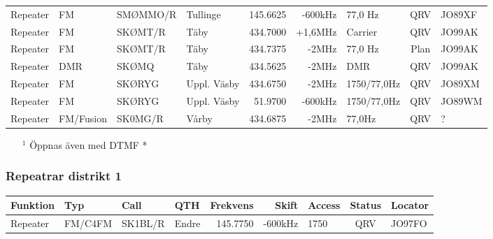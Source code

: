 \begin{longtable}{llllrrlcl}
	Repeater           & FM           & SMØMMO/R      & Tullinge     &          145.6625 &        -600kHz & 77,0 Hz         &       QRV       & JO89XF           \\
	Repeater           & FM           & SKØMT/R       & Täby         &          434.7000 &        +1,6MHz & Carrier         &       QRV       & JO99AK           \\
	Repeater           & FM           & SKØMT/R       & Täby         &          434.7375 &          -2MHz & 77,0 Hz         &      Plan       & JO99AK           \\
	Repeater           & DMR          & SKØMQ         & Täby         &          434.5625 &          -2MHz & DMR             &       QRV       & JO99AK           \\
	Repeater           & FM           & SKØRYG        & Uppl. Väsby  &          434.6750 &          -2MHz & 1750/77,0Hz     &       QRV       & JO89XM           \\
	Repeater           & FM           & SKØRYG        & Uppl. Väsby  &           51.9700 &        -600kHz & 1750/77,0Hz     &       QRV       & JO89WM           \\
	Repeater           & FM/Fusion    & SK0MG/R         & Vårby        &          434.6875 &          -2MHz & 77,0Hz          &       QRV       & ?
\end{longtable}
\begin{itemize}
	\item[$^1$] Öppnas även med DTMF *
\end{itemize}


\clearpage

\subsubsection{Repeatrar distrikt 1}

\begin{longtable}{llllrrlcl}
\textbf{Funktion} & \textbf{Typ} & \textbf{Call} & \textbf{QTH} & \textbf{Frekvens} & \textbf{Skift} & \textbf{Access} & \textbf{Status} & \textbf{Locator} \\ \hline \endhead
Repeater          & FM/C4FM      & SK1BL/R       & Endre	& 145.7750          & -600kHz        & 1750            & QRV             & JO97FO           \\
\end{longtable}


